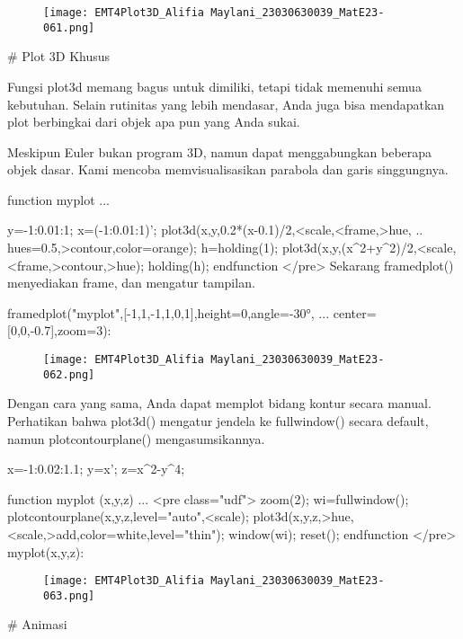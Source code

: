 \documentclass{article}
\begin{document}
\begin{figure}
    \centering
    \texttt{[image: EMT4Plot3D\_Alifia Maylani\_23030630039\_MatE23-061.png]}
    \caption{}
    \label{fig:enter-label}
\end{figure}

# Plot 3D Khusus

Fungsi plot3d memang bagus untuk dimiliki, tetapi tidak memenuhi semua
kebutuhan. Selain rutinitas yang lebih mendasar, Anda juga bisa
mendapatkan plot berbingkai dari objek apa pun yang Anda sukai.


Meskipun Euler bukan program 3D, namun dapat menggabungkan beberapa
objek dasar. Kami mencoba memvisualisasikan parabola dan garis
singgungnya.


\>function myplot ...


      y=-1:0.01:1; x=(-1:0.01:1)';
      plot3d(x,y,0.2*(x-0.1)/2,<scale,<frame,>hue, ..
        hues=0.5,>contour,color=orange);
      h=holding(1);
      plot3d(x,y,(x^2+y^2)/2,<scale,<frame,>contour,>hue);
      holding(h);
    endfunction
</pre>
Sekarang framedplot() menyediakan frame, dan mengatur tampilan.


\>framedplot("myplot",[-1,1,-1,1,0,1],height=0,angle=-30°, ...  
\>     center=[0,0,-0.7],zoom=3):


\begin{figure}
    \centering
    \texttt{[image: EMT4Plot3D\_Alifia Maylani\_23030630039\_MatE23-062.png]}
    \caption{}
    \label{fig:enter-label}
\end{figure}

Dengan cara yang sama, Anda dapat memplot bidang kontur secara manual.
Perhatikan bahwa plot3d() mengatur jendela ke fullwindow() secara
default, namun plotcontourplane() mengasumsikannya.


\>x=-1:0.02:1.1; y=x'; z=x^2-y^4;

\>function myplot (x,y,z) ...  
\>  
<pre class="udf">      zoom(2);
      wi=fullwindow();
      plotcontourplane(x,y,z,level="auto",<scale);
      plot3d(x,y,z,>hue,<scale,>add,color=white,level="thin");
      window(wi);
      reset();
    endfunction
</pre>
\>myplot(x,y,z):


\begin{figure}
    \centering
    \texttt{[image: EMT4Plot3D\_Alifia Maylani\_23030630039\_MatE23-063.png]}
    \caption{}
    \label{fig:enter-label}
\end{figure}

# Animasi
\end{document}
